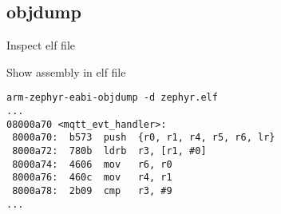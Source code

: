 \subsection{objdump}

\begin{frame}[fragile]{Inspect elf file}
  \begin{exampleblock}{Show assembly in elf file}
    \begin{lstlisting}[showstringspaces=false]
arm-zephyr-eabi-objdump -d zephyr.elf
...
08000a70 <mqtt_evt_handler>:
 8000a70:  b573  push  {r0, r1, r4, r5, r6, lr}
 8000a72:  780b  ldrb  r3, [r1, #0]
 8000a74:  4606  mov   r6, r0
 8000a76:  460c  mov   r4, r1
 8000a78:  2b09  cmp   r3, #9
...
    \end{lstlisting}
  \end{exampleblock}
\end{frame}
